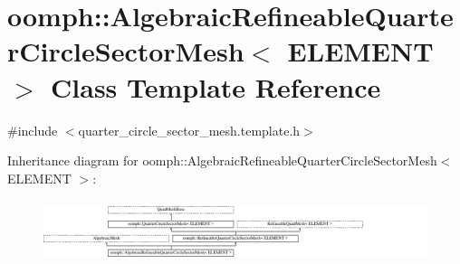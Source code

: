 \hypertarget{classoomph_1_1AlgebraicRefineableQuarterCircleSectorMesh}{}\section{oomph\+:\+:Algebraic\+Refineable\+Quarter\+Circle\+Sector\+Mesh$<$ E\+L\+E\+M\+E\+NT $>$ Class Template Reference}
\label{classoomph_1_1AlgebraicRefineableQuarterCircleSectorMesh}


{\ttfamily \#include $<$quarter\+\_\+circle\+\_\+sector\+\_\+mesh.\+template.\+h$>$}

Inheritance diagram for oomph\+:\+:Algebraic\+Refineable\+Quarter\+Circle\+Sector\+Mesh$<$ E\+L\+E\+M\+E\+NT $>$\+:\begin{figure}[H]
\begin{center}
\leavevmode
\includegraphics[height=1.839080cm]{classoomph_1_1AlgebraicRefineableQuarterCircleSectorMesh}
\end{center}
\end{figure}
